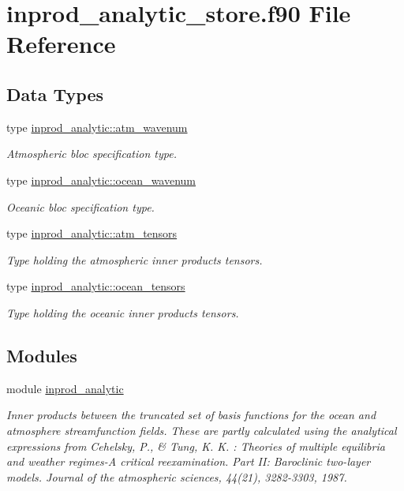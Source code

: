 \hypertarget{inprod__analytic__store_8f90}{}\section{inprod\+\_\+analytic\+\_\+store.\+f90 File Reference}
\label{inprod__analytic__store_8f90}
\subsection*{Data Types}
\begin{DoxyCompactItemize}
\item 
type \hyperlink{structinprod__analytic_1_1atm__wavenum}{inprod\+\_\+analytic\+::atm\+\_\+wavenum}
\begin{DoxyCompactList}\small\item\em Atmospheric bloc specification type. \end{DoxyCompactList}\item 
type \hyperlink{structinprod__analytic_1_1ocean__wavenum}{inprod\+\_\+analytic\+::ocean\+\_\+wavenum}
\begin{DoxyCompactList}\small\item\em Oceanic bloc specification type. \end{DoxyCompactList}\item 
type \hyperlink{structinprod__analytic_1_1atm__tensors}{inprod\+\_\+analytic\+::atm\+\_\+tensors}
\begin{DoxyCompactList}\small\item\em Type holding the atmospheric inner products tensors. \end{DoxyCompactList}\item 
type \hyperlink{structinprod__analytic_1_1ocean__tensors}{inprod\+\_\+analytic\+::ocean\+\_\+tensors}
\begin{DoxyCompactList}\small\item\em Type holding the oceanic inner products tensors. \end{DoxyCompactList}\end{DoxyCompactItemize}
\subsection*{Modules}
\begin{DoxyCompactItemize}
\item 
module \hyperlink{namespaceinprod__analytic}{inprod\+\_\+analytic}
\begin{DoxyCompactList}\small\item\em Inner products between the truncated set of basis functions for the ocean and atmosphere streamfunction fields. These are partly calculated using the analytical expressions from Cehelsky, P., \& Tung, K. K. \+: Theories of multiple equilibria and weather regimes-\/A critical reexamination. Part II\+: Baroclinic two-\/layer models. Journal of the atmospheric sciences, 44(21), 3282-\/3303, 1987. \end{DoxyCompactList}\end{DoxyCompactItemize}
